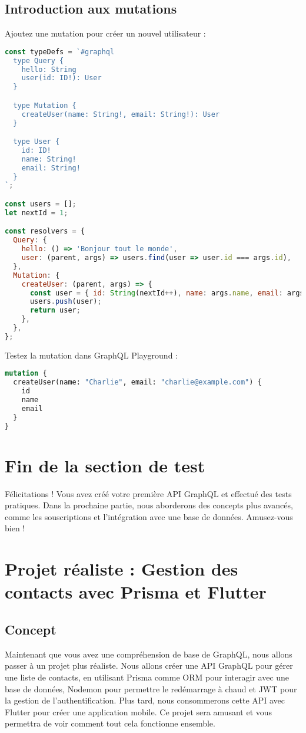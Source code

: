 \documentclass{article}
\begin{document}
\subsection{Introduction aux mutations}
Ajoutez une mutation pour créer un nouvel utilisateur :
\begin{lstlisting}[language=JavaScript]
const typeDefs = `#graphql
  type Query {
    hello: String
    user(id: ID!): User
  }

  type Mutation {
    createUser(name: String!, email: String!): User
  }

  type User {
    id: ID!
    name: String!
    email: String!
  }
`;

const users = [];
let nextId = 1;

const resolvers = {
  Query: {
    hello: () => 'Bonjour tout le monde',
    user: (parent, args) => users.find(user => user.id === args.id),
  },
  Mutation: {
    createUser: (parent, args) => {
      const user = { id: String(nextId++), name: args.name, email: args.email };
      users.push(user);
      return user;
    },
  },
};
\end{lstlisting}

Testez la mutation dans GraphQL Playground :
\begin{lstlisting}[language=GraphQL]
mutation {
  createUser(name: "Charlie", email: "charlie@example.com") {
    id
    name
    email
  }
}
\end{lstlisting}

\section{Fin de la section de test}
Félicitations ! \faTrophy Vous avez créé votre première API GraphQL et effectué des tests pratiques. Dans la prochaine partie, nous aborderons des concepts plus avancés, comme les souscriptions et l'intégration avec une base de données. Amusez-vous bien ! \faSmileO

\section{Projet réaliste : Gestion des contacts avec Prisma et Flutter}
\subsection{Concept}
Maintenant que vous avez une compréhension de base de GraphQL, nous allons passer à un projet plus réaliste. Nous allons créer une API GraphQL pour gérer une liste de contacts, en utilisant Prisma comme ORM pour interagir avec une base de données, Nodemon pour permettre le redémarrage à chaud et JWT pour la gestion de l'authentification. Plus tard, nous consommerons cette API avec Flutter pour créer une application mobile. Ce projet sera amusant et vous permettra de voir comment tout cela fonctionne ensemble.
\end{document}
